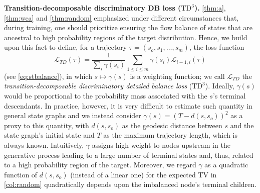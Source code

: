 \vspace{4pt}\noindent\textbf{Transition-decomposable discriminatory DB loss ($\text{TD}^{3}$).} \autoref{thm:a}, \autoref{thm:wca} and \autoref{thm:random} emphasized under different circumstances that, during training, one should prioritize ensuring the flow balance of states that are ancestral to high probability regions of the target distribution. Hence, we build upon this fact to define, for a trajectory $\tau = (s_{o}, s_{1}, \dots, s_{m})$, the loss function 
\begin{equation*}
    \mathcal{L}_{TD}(\tau) = \frac{1}{\sum_{i} \gamma(s_{i})} \sum_{1 \le i \le m} \gamma(s_{i}) \mathcal{L}_{i - 1, i}(\tau)%
\end{equation*}
(see \autoref{eq:stbalance}), in which $s \mapsto \gamma(s)$ is a weighting function; we call $\mathcal{L}_{TD}$ the \textit{transition-decomposable discriminatory detailed balance loss} ($\text{TD}^{3}$). Ideally, $\gamma(s)$ would be proportional to the probability mass associated with the $s$'s terminal descendants. In practice, however, it is very difficult to estimate such quantity in general state graphs and we instead consider $\gamma(s) = (T - d(s, s_{o}))^{2}$ as a proxy to this quantity, with $d(s, s_{o})$ as the geodesic distance between $s$ and the state graph's initial state and $T$ as the maximum trajectory length, which is always known. Intuitively, $\gamma$ assigns high weight to nodes upstream in the generative process leading to a large number of terminal states and, thus, related to a high probability region of the target. Moreover, we regard $\gamma$ as a quadratic function of $d(s, s_{o})$ (instead of a linear one) for the expected TV in \autoref{col:random} quadratically depends upon the imbalanced node's terminal children.   




